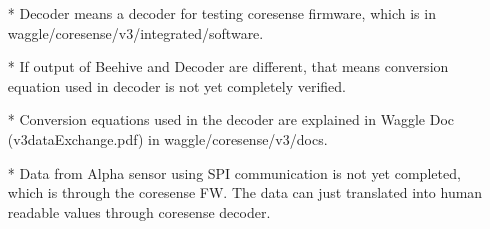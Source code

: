\begin{landscape}
\begin{itemize}
\item[*] Decoder means a decoder for testing coresense firmware, which is in waggle/coresense/v3/integrated/software.
\item[*] If output of Beehive and Decoder are different, that means conversion equation used in decoder is not yet completely verified.
\item[*] Conversion equations used in the decoder are explained in Waggle Doc (v3dataExchange.pdf) in waggle/coresense/v3/docs.
\item[*] Data from Alpha sensor using SPI communication is not yet completed, which is through the coresense FW. The data can just translated into human readable values through coresense decoder.
\end{itemize}

\end{landscape}

